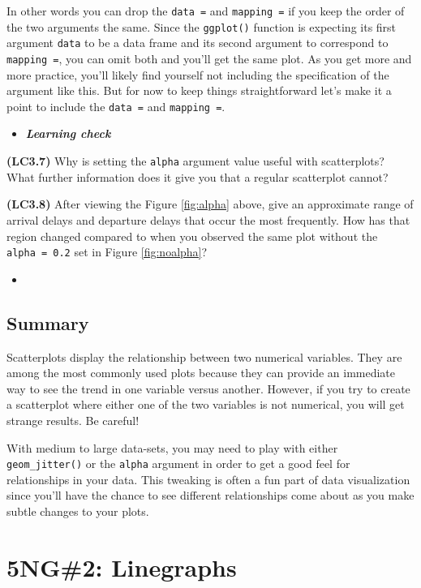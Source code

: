 \documentclass[12pt,]{krantz}
\newenvironment{rmdblock}[1]
  {\begin{shaded*}
  \begin{itemize}
  \renewcommand{\labelitemi}{
    \raisebox{-.7\height}[0pt][0pt]{
    }
  }
  \item
  }
  {
  \end{itemize}
  \end{shaded*}
  }
\newenvironment{learncheck}
  {\begin{rmdblock}{warning}}
  {\end{rmdblock}}
\begin{document}
In other words you can drop the \texttt{data\ =} and \texttt{mapping\ =}
if you keep the order of the two arguments the same. Since the
\texttt{ggplot()} function is expecting its first argument \texttt{data}
to be a data frame and its second argument to correspond to
\texttt{mapping\ =}, you can omit both and you'll get the same plot. As
you get more and more practice, you'll likely find yourself not
including the specification of the argument like this. But for now to
keep things straightforward let's make it a point to include the
\texttt{data\ =} and \texttt{mapping\ =}.

\begin{learncheck}
\textbf{\emph{Learning check}}
\end{learncheck}

\textbf{(LC3.7)} Why is setting the \texttt{alpha} argument value useful
with scatterplots? What further information does it give you that a
regular scatterplot cannot?

\textbf{(LC3.8)} After viewing the Figure \ref{fig:alpha} above, give an
approximate range of arrival delays and departure delays that occur the
most frequently. How has that region changed compared to when you
observed the same plot without the \texttt{alpha\ =\ 0.2} set in Figure
\ref{fig:noalpha}?

\begin{learncheck}

\end{learncheck}

\subsection{Summary}\label{summary}

Scatterplots display the relationship between two numerical variables.
They are among the most commonly used plots because they can provide an
immediate way to see the trend in one variable versus another. However,
if you try to create a scatterplot where either one of the two variables
is not numerical, you will get strange results. Be careful!

With medium to large data-sets, you may need to play with either
\texttt{geom\_jitter()} or the \texttt{alpha} argument in order to get a
good feel for relationships in your data. This tweaking is often a fun
part of data visualization since you'll have the chance to see different
relationships come about as you make subtle changes to your plots.

\section{5NG\#2: Linegraphs}\label{linegraphs}
\end{document}

